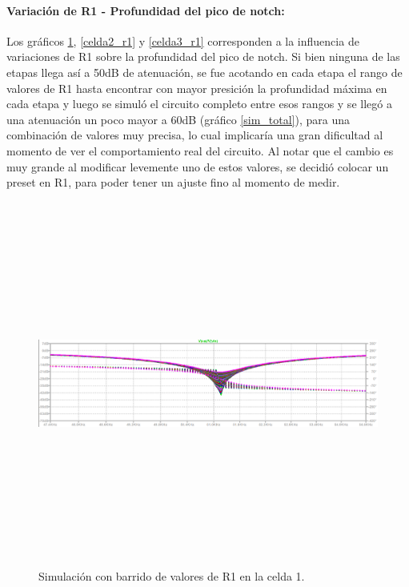 \paragraph{Variaci\'on de R1 - Profundidad del pico de notch:} Los gr\'aficos \ref{celda1_r1}, \ref{celda2_r1} y \ref{celda3_r1} corresponden a la influencia de variaciones de R1 sobre la profundidad del pico de notch. Si bien ninguna de las etapas llega as\'i a 50dB de atenuaci\'on, se fue acotando en cada etapa el rango de valores de R1 hasta encontrar con mayor presici\'on la profundidad m\'axima en cada etapa y luego se simul\'o el circuito completo entre esos rangos y se lleg\'o a una atenuaci\'on un poco mayor a 60dB (gr\'afico \ref{sim_total}), para una combinaci\'on de valores muy precisa, lo cual implicar\'ia una gran dificultad al momento de ver el comportamiento real del circuito. Al notar que el cambio es muy grande al modificar levemente uno de estos valores, se decidi\'o colocar un preset en R1, para poder tener un ajuste fino al momento de medir. 

 \begin{figure}[H] %
	\centering	\includegraphics[width=12cm,height=12cm,keepaspectratio]{../EJ4/graficos/etapa1_R1.png}
	\caption{Simulaci\'on con barrido de valores de R1 en la celda 1.}
	\label{celda1_r1}
\end{figure}

